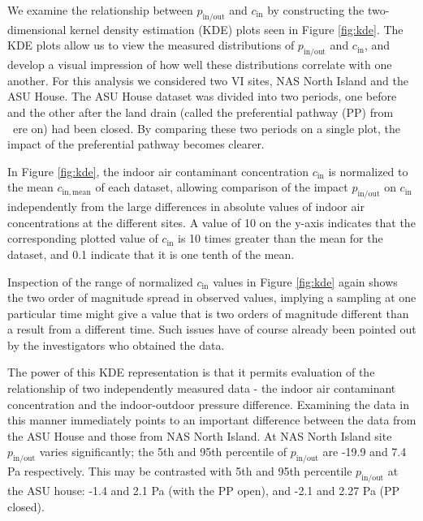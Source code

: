 \documentclass[journal=esthag,manuscript=article]{achemso}
\begin{document}
We examine the relationship between $p_\mathrm{in/out}$ and $c_\mathrm{in}$ by constructing the two-dimensional kernel density estimation (KDE) plots seen in Figure \ref{fig:kde}.
The KDE plots allow us to view the measured distributions of $p_\mathrm{in/out}$ and $c_\mathrm{in}$, and develop a visual impression of how well these distributions correlate with one another.
For this analysis we considered two VI sites, NAS North Island and the ASU House.
The ASU House dataset was divided into two periods, one before and the other after the land drain (called the preferential pathway (PP) from  ere on) had been closed.
By comparing these two periods on a single plot, the impact of the preferential pathway becomes clearer.\par

In Figure \ref{fig:kde}, the indoor air contaminant concentration $c_\mathrm{in}$ is normalized to the mean $c_\mathrm{in,mean}$ of each dataset, allowing comparison of the impact $p_\mathrm{in/out}$ on $c_\mathrm{in}$ independently from the large differences in absolute values of indoor air concentrations at the different sites.
A value of 10 on the y-axis indicates that the corresponding plotted value of $c_\mathrm{in}$ is 10 times greater than the mean for the dataset, and 0.1 indicate that it is one tenth of the mean.\par

Inspection of the range of normalized $c_\mathrm{in}$ values in Figure \ref{fig:kde} again shows the two order of magnitude spread in observed values, implying a sampling at one particular time might give a value that is two orders of magnitude different than a result from a different time.
Such issues have of course already been pointed out by the investigators who obtained the data.\par

The power of this KDE representation is that it permits evaluation of the relationship of two independently measured data - the indoor air contaminant concentration and the indoor-outdoor pressure difference.
Examining the data in this manner immediately points to an important difference between the data from the ASU House and those from NAS North Island.
At NAS North Island site $p_\mathrm{in/out}$ varies significantly; the 5th and 95th percentile of $p_\mathrm{in/out}$ are -19.9 and 7.4 Pa respectively.
This may be contrasted with 5th and 95th percentile $p_\mathrm{in/out}$ at the ASU house: -1.4 and 2.1 Pa (with the PP open), and -2.1 and 2.27 Pa (PP closed).\par
\end{document}
